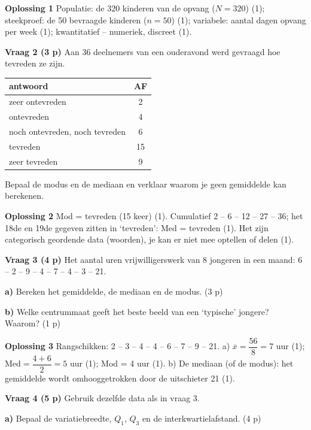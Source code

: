 \begin{oplossing}
\textbf{Oplossing 1} \quad Populatie: de 320 kinderen van de opvang ($N=320$) (1); steekproef: de 50 bevraagde kinderen ($n=50$) (1); variabele: aantal dagen opvang per week (1); kwantitatief – numeriek, discreet (1).
\end{oplossing}

\textbf{Vraag 2 \quad (3 p)} Aan 36 deelnemers van een ouderavond werd gevraagd hoe tevreden ze zijn.

\begin{tabular}{lc}
\hline
antwoord & AF \\
\hline
zeer ontevreden & 2 \\
ontevreden & 4 \\
noch ontevreden, noch tevreden & 6 \\
tevreden & 15 \\
zeer tevreden & 9 \\
\hline
\end{tabular}

Bepaal de modus en de mediaan en verklaar waarom je geen gemiddelde kan berekenen. \lijn

\begin{oplossing}
\textbf{Oplossing 2} \quad Mod = tevreden (15 keer) (1). Cumulatief 2 – 6 – 12 – 27 – 36; het 18de en 19de gegeven zitten in ‘tevreden’: Med = tevreden (1). Het zijn categorisch geordende data (woorden), je kan er niet mee optellen of delen (1).
\end{oplossing}

\textbf{Vraag 3 \quad (4 p)} Het aantal uren vrijwilligerswerk van 8 jongeren in een maand: 6 – 2 – 9 – 4 – 7 – 4 – 3 – 21.

\textbf{a)} Bereken het gemiddelde, de mediaan en de modus. (3 p) \lijn

\textbf{b)} Welke centrummaat geeft het beste beeld van een ‘typische’ jongere? Waarom? (1 p) \lijn

\begin{oplossing}
\textbf{Oplossing 3} \quad Rangschikken: 2 – 3 – 4 – 4 – 6 – 7 – 9 – 21. a) $\overline{x}=\dfrac{56}{8}=7$ uur (1); $\text{Med}=\dfrac{4+6}{2}=5$ uur (1); Mod = 4 uur (1). b) De mediaan (of de modus): het gemiddelde wordt omhooggetrokken door de uitschieter 21 (1).
\end{oplossing}

\textbf{Vraag 4 \quad (5 p)} Gebruik dezelfde data als in vraag 3.

\textbf{a)} Bepaal de variatiebreedte, $Q_1$, $Q_3$ en de interkwartielafstand. (4 p) \lijn


